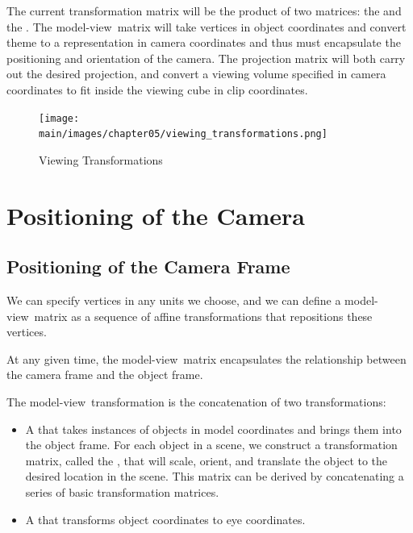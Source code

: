 \documentclass[../COS3712_Notes.tex]{subfiles}
\begin{document}
      The current transformation matrix will be the product of two matrices:
      the  and the .
      The model-view~matrix will take vertices in object coordinates and convert theme
      to a representation in camera coordinates and thus must encapsulate the positioning
      and orientation of the camera.
      The projection matrix will both carry out the desired projection,
      and convert a viewing volume specified in camera coordinates to fit inside the viewing
      cube in clip coordinates.

      \begin{figure}
        \begin{center}
          \texttt{[image: \\main/images/chapter05/viewing\_transformations.png]}
        \end{center}
        \caption{Viewing Transformations}
      \end{figure}

    \section{Positioning of the Camera}
      \subsection{Positioning of the Camera Frame}
        We can specify vertices in any units we choose, and we can define a model-view~matrix
        as a sequence of affine transformations that repositions these vertices.

        At any given time, the model-view~matrix encapsulates the relationship between the
        camera frame and the object frame.

        The model-view~transformation is the concatenation of two transformations:
        \begin{itemize}
          \item A  that takes instances of objects
            in model coordinates and brings them into the object frame.
            For each object in a scene, we construct a transformation matrix,
            called the , that will scale, orient, and translate
            the object to the desired location in the scene.
            This matrix can be derived by concatenating a series of basic transformation matrices.
          \item A  that transforms object coordinates
            to eye coordinates.
        \end{itemize}
\end{document}
